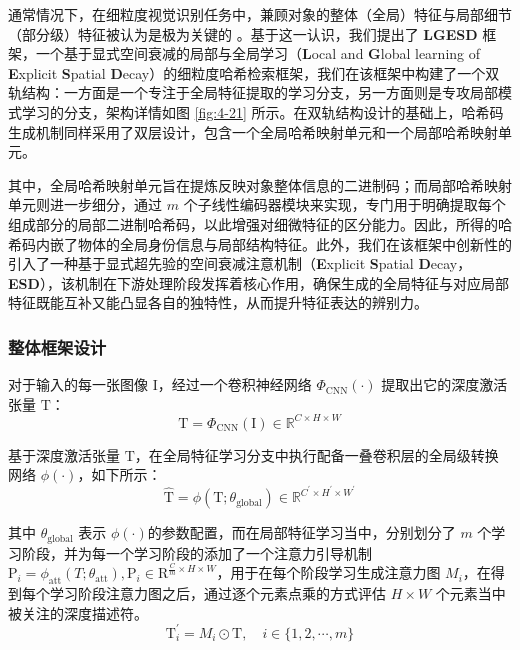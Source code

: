通常情况下，在细粒度视觉识别任务中，兼顾对象的整体（全局）特征与局部细节（部分级）特征被认为是极为关键的 \cite{wei2021finegrained}。基于这一认识，我们提出了 \textbf{LGESD} 框架，一个基于显式空间衰减的局部与全局学习（\textbf{L}ocal and \textbf{G}lobal learning of \textbf{E}xplicit \textbf{S}patial \textbf{D}ecay）的细粒度哈希检索框架，我们在该框架中构建了一个双轨结构：一方面是一个专注于全局特征提取的学习分支，另一方面则是专攻局部模式学习的分支，架构详情如图 \ref{fig:4-21} 所示。在双轨结构设计的基础上，哈希码生成机制同样采用了双层设计，包含一个全局哈希映射单元和一个局部哈希映射单元。

其中，全局哈希映射单元旨在提炼反映对象整体信息的二进制码；而局部哈希映射单元则进一步细分，通过 $m$ 个子线性编码器模块来实现，专门用于明确提取每个组成部分的局部二进制哈希码，以此增强对细微特征的区分能力。因此，所得的哈希码内嵌了物体的全局身份信息与局部结构特征。此外，我们在该框架中创新性的引入了一种基于显式超先验的空间衰减注意机制（\textbf{E}xplicit \textbf{S}patial \textbf{D}ecay，\textbf{ESD}），该机制在下游处理阶段发挥着核心作用，确保生成的全局特征与对应局部特征既能互补又能凸显各自的独特性，从而提升特征表达的辨别力。

\subsubsection{整体框架设计}

对于输入的每一张图像 $\mathrm{I}$，经过一个卷积神经网络 $\Phi_{\mathrm{CNN}}(\cdot)$ 提取出它的深度激活张量 $\mathrm{T}$：
\begin{equation}
    \mathrm{T}=\Phi_{\mathrm{CNN}}(\mathrm{I})\in\mathbb{R}^{C\times H\times W}
\end{equation}

基于深度激活张量 $\mathrm{T}$，在全局特征学习分支中执行配备一叠卷积层的全局级转换网络 $\phi(\cdot)$，如下所示：
\begin{equation}
\hat{\mathrm{T}}=\phi(\mathrm{T};\theta_{\mathrm{global}})\in\mathbb{R}^{C^{\prime}\times H^{\prime}\times W^{\prime}}
\end{equation}

其中 $\theta_{\mathrm{global}}$ 表示 $\phi(\cdot)$的参数配置，而在局部特征学习当中，分别划分了 $m$ 个学习阶段，并为每一个学习阶段的添加了一个注意力引导机制 $\mathrm{P}_i = \phi_{\mathrm{att}}(T;\theta_{\mathrm{att}}), \mathrm{P}_i \in \mathrm{R}^{\frac{C}{m} \times H \times W}$，用于在每个阶段学习生成注意力图 $M_i$，在得到每个学习阶段注意力图之后，通过逐个元素点乘的方式评估 $H \times W$ 个元素当中被关注的深度描述符。
\begin{equation}
    \mathrm{T}_i^{\prime}=M_i\odot \mathrm{T}, \quad i \in \{1,2,\cdots,m \}
    \label{eq:eq_4_m}
\end{equation}

